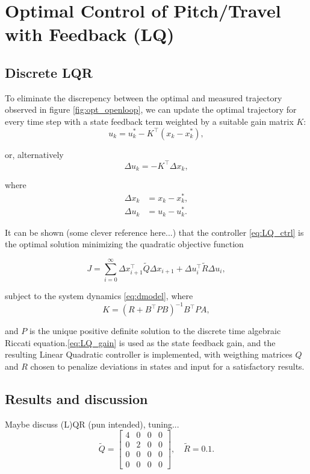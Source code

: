 \section{Optimal Control of Pitch/Travel with Feedback (LQ)}\label{sec:prob3}

\subsection{Discrete LQR}
\label{text:LQR}

To eliminate the discrepency between the optimal and measured trajectory observed in figure \ref{fig:opt_openloop}, we can update the optimal trajectory for every time step with a state feedback term weighted by a suitable gain matrix $K$:
\begin{equation*}
u_k = u_k^* - K^\top(x_k - x_k^*),
\end{equation*}

or, alternatively
\begin{equation}
\label{eq:LQ_ctrl}
\Delta u_k = - K^\top \Delta x_k,
\end{equation}

where 
\begin{align*}
\Delta x_k &= x_k - x_k^*,\\
\Delta u_k &= u_k - u_k^*.
\end{align*}

It can be shown (some clever reference here...) that the controller \eqref{eq:LQ_ctrl} is the optimal solution minimizing the quadratic objective function

\begin{equation*}
	J = \sum_{i=0}^{\infty} \Delta x_{i+1}^\top \tilde{Q} \Delta x_{i+1} + \Delta u_i^\top \tilde{R} \Delta u_i,
\end{equation*}

subject to the system dynamics \eqref{eq:dmodel}, where
\begin{equation}
\label{eq:LQ_gain}
	K = (R + B^\top P B)^{-1} B^\top P A,
\end{equation}

and $P$ is the unique positive definite solution to the discrete time algebraic Riccati equation.\eqref{eq:LQ_gain} is used as the state feedback gain, and the resulting Linear Quadratic controller is implemented, with weigthing matrices $Q$ and $R$ chosen to penalize deviations in states and input for a satisfactory results.

\subsection{Results and discussion}
Maybe discuss (L)QR (pun intended), tuning...
\begin{equation*}
\tilde{Q} = \begin{bmatrix}4&0&0&0\\0&2&0&0\\0&0&0&0\\0&0&0&0\end{bmatrix}, \quad \tilde{R} = 0.1.
\end{equation*}

